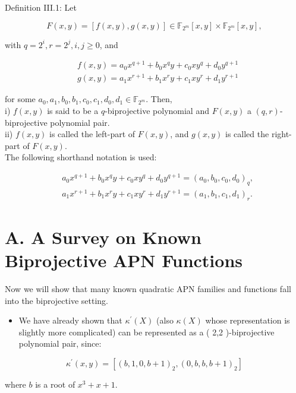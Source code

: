 \documentclass[10pt]{article}
\begin{document}
Definition III.1: Let


\begin{equation*}
F(x, y)=[f(x, y), g(x, y)] \in \mathbb{F}_{2^{m}}[x, y] \times \mathbb{F}_{2^{m}}[x, y], \tag{2}
\end{equation*}


with $q=2^{i}, r=2^{j}, i, j \geq 0$, and

$$
\begin{aligned}
& f(x, y)=a_{0} x^{q+1}+b_{0} x^{q} y+c_{0} x y^{q}+d_{0} y^{q+1} \\
& g(x, y)=a_{1} x^{r+1}+b_{1} x^{r} y+c_{1} x y^{r}+d_{1} y^{r+1}
\end{aligned}
$$

for some $a_{0}, a_{1}, b_{0}, b_{1}, c_{0}, c_{1}, d_{0}, d_{1} \in \mathbb{F}_{2^{m}}$. Then,\\
i) $f(x, y)$ is said to be a $q$-biprojective polynomial and $F(x, y)$ a $(q, r)$-biprojective polynomial pair.\\
ii) $f(x, y)$ is called the left-part of $F(x, y)$, and $g(x, y)$ is called the right-part of $F(x, y)$.\\
The following shorthand notation is used:

$$
\begin{aligned}
& a_{0} x^{q+1}+b_{0} x^{q} y+c_{0} x y^{q}+d_{0} y^{q+1}=\left(a_{0}, b_{0}, c_{0}, d_{0}\right)_{q}, \\
& a_{1} x^{r+1}+b_{1} x^{r} y+c_{1} x y^{r}+d_{1} y^{r+1}=\left(a_{1}, b_{1}, c_{1}, d_{1}\right)_{r} .
\end{aligned}
$$

\section*{A. A Survey on Known Biprojective APN Functions}
Now we will show that many known quadratic APN families and functions fall into the biprojective setting.

\begin{itemize}
  \item We have already shown that $\kappa^{\prime}(X)$ (also $\kappa(X)$ whose representation is slightly more complicated) can be represented as a ( 2,2 )-biprojective polynomial pair, since:
\end{itemize}

$$
\kappa^{\prime}(x, y)=\left[(b, 1,0, b+1)_{2},(0, b, b, b+1)_{2}\right]
$$

where $b$ is a root of $x^{3}+x+1$.
\end{document}
